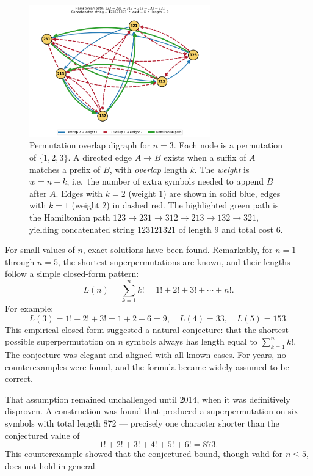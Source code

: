 \begin{figure}[ht]
 \centering
 \includegraphics[width=0.7\textwidth]{39_SuperpermutationsBreakthrough/GRAPH2.png}
 \caption{Permutation overlap digraph for $n=3$. Each node is a permutation of $\{1,2,3\}$. A directed edge $A \to B$ exists when a suffix of $A$ matches a prefix of $B$, with \emph{overlap} length $k$. The \emph{weight} is $w = n-k$, i.e.\ the number of extra symbols needed to append $B$ after $A$. Edges with $k=2$ (weight $1$) are shown in solid blue, edges with $k=1$ (weight $2$) in dashed red. The highlighted green path is the Hamiltonian path $123 \to 231 \to 312 \to 213 \to 132 \to 321$, yielding concatenated string $123121321$ of length $9$ and total cost $6$.}
 \label{fig:permgraph3}
\end{figure}

For small values of $n$, exact solutions have been found. Remarkably, for $n = 1$ through $n = 5$, the shortest superpermutations are known, and their lengths follow a simple closed-form pattern:
\[
L(n) = \sum_{k=1}^n k! = 1! + 2! + 3! + \cdots + n!.
\]
For example:
\[
L(3) = 1! + 2! + 3! = 1 + 2 + 6 = 9, \quad
L(4) = 33, \quad
L(5) = 153.
\]
This empirical closed-form suggested a natural conjecture: that the shortest possible superpermutation on $n$ symbols always has length equal to $\sum_{k=1}^n k!$. The conjecture was elegant and aligned with all known cases. For years, no counterexamples were found, and the formula became widely assumed to be correct.

That assumption remained unchallenged until 2014, when it was definitively disproven. A construction was found that produced a superpermutation on six symbols with total length 872 — precisely one character shorter than the conjectured value of
\[
1! + 2! + 3! + 4! + 5! + 6! = 873.
\]
This counterexample showed that the conjectured bound, though valid for $n \leq 5$, does not hold in general.

